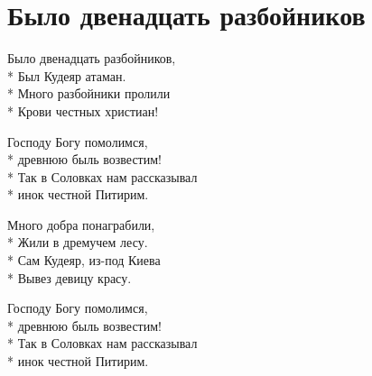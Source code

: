 \section{Было двенадцать разбойников}
\label{song:Было_двенадцать_разбойников}

\medskip

\begin{minipage}{\linewidth}
Было двенадцать разбойников,\\*
Был Кудеяр атаман.\\*
Много разбойники пролили\\*
Крови честных христиан!\\
\end{minipage}\par\medskip\nobreak

\medskip

\begin{minipage}{\linewidth}
\hspace*{1.5em}Господу Богу помолимся,\\*
\hspace*{1.5em}древнюю быль возвестим! \\*
\hspace*{1.5em}Так в Соловках нам рассказывал\\*
\hspace*{1.5em}инок честной Питирим.\\
\end{minipage}\par\medskip\nobreak

\medskip

\begin{minipage}{\linewidth}
Много добра понаграбили,\\*
Жили в дремучем лесу.\\*
Сам Кудеяр, из-под Киева\\*
Вывез девицу красу.\\
\end{minipage}\par\medskip\nobreak

\medskip

\begin{minipage}{\linewidth}
\hspace*{1.5em}Господу Богу помолимся,\\*
\hspace*{1.5em}древнюю быль возвестим! \\*
\hspace*{1.5em}Так в Соловках нам рассказывал\\*
\hspace*{1.5em}инок честной Питирим.\\
\end{minipage}\par\medskip\nobreak

